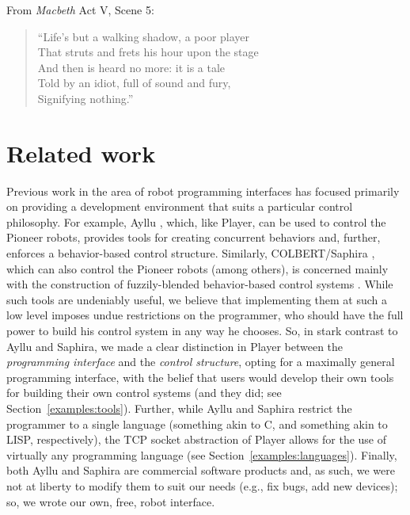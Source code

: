 \documentclass[]{article}
\begin{document}
From {\sl Macbeth} Act V, Scene 5:
\begin{quote}
  ``Life's but a walking shadow, a poor player \\
  That struts and frets his hour upon the stage \\
  And then is heard no more: it is a tale \\
  Told by an idiot, full of sound and fury, \\
  Signifying nothing.''\\
\end{quote}

\section{Related work}
Previous work in the area of robot programming interfaces has 
focused primarily on providing a development environment that suits
a particular control philosophy.  For example, Ayllu \cite{Werger00},
which, like Player, can be used to control the Pioneer robots, provides
tools for creating concurrent behaviors and, further, enforces a 
behavior-based control structure.  Similarly, COLBERT/Saphira 
\cite{Konolige97}, which can also control the Pioneer robots (among others), 
is concerned mainly with the construction of fuzzily-blended behavior-based 
control systems \cite{SaffiottiRuspiniKonolige93}.
While such tools are undeniably useful, we believe that implementing them 
at such a low level imposes undue restrictions on the programmer, who should 
have the full power to build his control system in any way he chooses.
So, in stark contrast to Ayllu and Saphira, we made a clear distinction
in Player between the {\sl programming interface} and the {\sl control
structure}, opting for a maximally general programming interface, with the
belief that users would develop their own tools for building their own
control systems (and they did; see Section~\ref{examples:tools}).  
Further, while Ayllu and Saphira restrict the programmer to a single language
(something akin to C, and something akin to LISP, respectively), the TCP
socket abstraction of Player allows for the use of virtually any programming 
language (see Section~\ref{examples:languages}).  Finally, both Ayllu and
Saphira are commercial software products and, as such, we were not at liberty
to modify them to suit our needs (e.g., fix bugs, add new devices); so, we 
wrote our own, free, robot interface.
\end{document}

